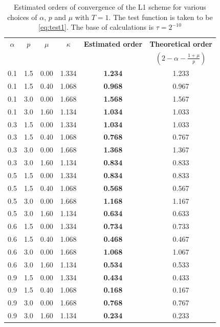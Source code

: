 \documentclass[12pt,a4paper]{article}
\theoremstyle{definition}
\begin{document}
\begin{table}[h]
\centering
\begin{tabular}{cccccc}
\hline
$\alpha$ & $p$ & $\mu$ & $\kappa$ & \textbf{Estimated order} & \textbf{Theoretical order} \\
 & & & &  & $(2 - \alpha - \frac{1+\mu}{p})$ \\
\hline
0.1 & 1.5 & 0.00 & 1.334 & \textbf{1.234} & 1.233 \\
0.1 & 1.5 & 0.40 & 1.068 & \textbf{0.968} & 0.967 \\
0.1 & 3.0 & 0.00 & 1.668 & \textbf{1.568} & 1.567 \\
0.1 & 3.0 & 1.60 & 1.134 & \textbf{1.034} & 1.033 \\
\hline
0.3 & 1.5 & 0.00 & 1.334 & \textbf{1.034} & 1.033 \\
0.3 & 1.5 & 0.40 & 1.068 & \textbf{0.768} & 0.767 \\
0.3 & 3.0 & 0.00 & 1.668 & \textbf{1.368} & 1.367 \\
0.3 & 3.0 & 1.60 & 1.134 & \textbf{0.834} & 0.833 \\
\hline
0.5 & 1.5 & 0.00 & 1.334 & \textbf{0.834} & 0.833 \\
0.5 & 1.5 & 0.40 & 1.068 & \textbf{0.568} & 0.567 \\
0.5 & 3.0 & 0.00 & 1.668 & \textbf{1.168} & 1.167 \\
0.5 & 3.0 & 1.60 & 1.134 & \textbf{0.634} & 0.633 \\
\hline
0.6 & 1.5 & 0.00 & 1.334 & \textbf{0.734} & 0.733 \\
0.6 & 1.5 & 0.40 & 1.068 & \textbf{0.468} & 0.467 \\
0.6 & 3.0 & 0.00 & 1.668 & \textbf{1.068} & 1.067 \\
0.6 & 3.0 & 1.60 & 1.134 & \textbf{0.534} & 0.533 \\
\hline
0.9 & 1.5 & 0.00 & 1.334 & \textbf{0.434} & 0.433 \\
0.9 & 1.5 & 0.40 & 1.068 & \textbf{0.168} & 0.167 \\
0.9 & 3.0 & 0.00 & 1.668 & \textbf{0.768} & 0.767 \\
0.9 & 3.0 & 1.60 & 1.134 & \textbf{0.234} & 0.233 \\
\hline
\end{tabular}
\caption{Estimated orders of convergence of the L1 scheme for various choices of $\alpha$, $p$ and $\mu$ with $T = 1$. The test function is taken to be \eqref{eq:test1}. The base of calculations is $\tau = 2^{-10}$}
\label{tab:tab1}
\end{table}
\end{document}

